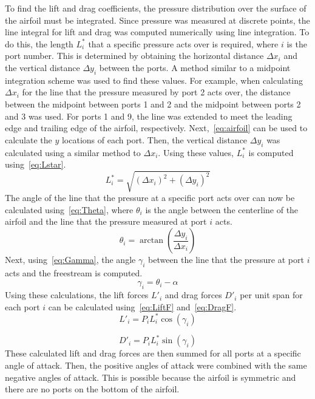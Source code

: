 \documentclass[journal,letterpaper]{IEEEtran}
\begin{document}
To find the lift and drag coefficients, the pressure distribution over the surface of the airfoil must be integrated.
Since pressure was measured at discrete points, the line integral for lift and drag was computed numerically using line integration.
To do this, the length $L_i^*$ that a specific pressure acts over is required, where $i$ is the port number.
This is determined by obtaining the horizontal distance $\Delta x_i$ and the vertical distance $\Delta y_i$ between the ports.
A method similar to a midpoint integration scheme was used to find these values.
For example, when calculating $\Delta x_i$ for the line that the pressure measured by port 2 acts over, the distance between the midpoint between ports 1 and 2 and the midpoint between ports 2 and 3 was used.
For ports 1 and 9, the line was extended to meet the leading edge and trailing edge of the airfoil, respectively.
Next,~\eqref{eq:airfoil} can be used to calculate the $y$ locations of each port. Then, the vertical distance $\Delta y_i$ was calculated using a similar method to $\Delta x_i$. Using these values, $L_i^*$ is computed using~\eqref{eq:Lstar}.
\begin{equation} \label{eq:Lstar}
    L_i^* = \sqrt{\left(\Delta x_i\right)^2 + \left(\Delta y_i\right)^2}
\end{equation}
The angle of the line that the pressure at a specific port acts over can now be calculated using~\eqref{eq:Theta}, where $\theta_i$ is the angle between the centerline of the airfoil and the line that the pressure measured at port $i$ acts.
\begin{equation} \label{eq:Theta}
    \theta_i = \arctan\left(\frac{\Delta y_i}{\Delta x_i}\right)
\end{equation}
Next, using~\eqref{eq:Gamma}, the angle $\gamma_i$ between the line that the pressure at port $i$ acts and the freestream is computed.
\begin{equation} \label{eq:Gamma}
    \gamma_i = \theta_i - \alpha
\end{equation}
Using these calculations, the lift forces $L'_i$ and drag forces $D'_i$  per unit span for each port $i$ can be calculated using~\eqref{eq:LiftF} and~\eqref{eq:DragF}.
\begin{equation} \label{eq:LiftF}
    L'_i = P_i L_i^* \cos\left(\gamma_i\right)
\end{equation}

\begin{equation} \label{eq:DragF}
    D'_i = P_i L_i^* \sin\left(\gamma_i\right)
\end{equation}
These calculated lift and drag forces are then summed for all ports at a specific angle of attack.
Then, the positive angles of attack were combined with the same negative angles of attack.
This is possible because the airfoil is symmetric and there are no ports on the bottom of the airfoil.
\end{document}
